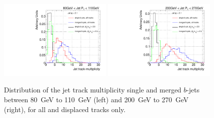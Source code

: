 \begin{figure}[tp]
\centering
\includegraphics[width=0.49\textwidth]{FIGS/TEMPFigs/DisplacedTracks/Ntrk_allanddisplacedW080.pdf}
\includegraphics[width=0.49\textwidth]{FIGS/TEMPFigs/DisplacedTracks/Ntrk_allanddisplacedW200.pdf}
\caption{Distribution of the jet track multiplicity single and merged $b$-jets between 80~GeV to 110~GeV (left) and 200~GeV to 270~GeV (right), for all and displaced tracks only.}
\label{fig:displacedntrk}
\end{figure}







